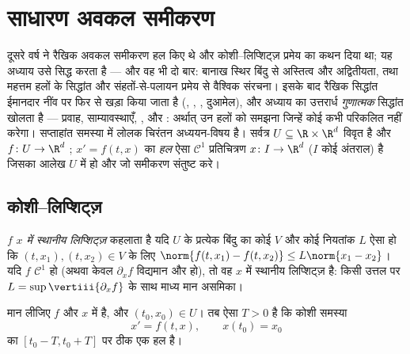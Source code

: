 \chapter{साधारण अवकल समीकरण}\label{ch:b3:ode}

दूसरे वर्ष ने रैखिक अवकल समीकरण हल किए थे और कोशी--लिप्शिट्ज़
प्रमेय का कथन दिया था; यह अध्याय उसे सिद्ध करता है --- और वह भी
दो बार: बानाख स्थिर बिंदु से अस्तित्व और अद्वितीयता, तथा महत्तम
हलों के सिद्धांत और संहतों-से-पलायन प्रमेय से वैश्विक संरचना।
इसके बाद रैखिक सिद्धांत ईमानदार नींव पर फिर से खड़ा किया जाता है
(, , , दुआमेल), और अध्याय का
उत्तरार्ध \emph{गुणात्मक} सिद्धांत खोलता है --- प्रवाह,
साम्यावस्थाएँ, , और : अर्थात्
उन हलों को समझना जिन्हें कोई कभी परिकलित नहीं करेगा। सप्ताहांत
समस्या में लोलक चिरंतन अध्ययन-विषय है। सर्वत्र $U \subseteq \R\times\R^d$ विवृत है और
$f \colon U \to \R^d$ ; $x' = f(t, x)$ का \emph{हल} ऐसा $\mathcal C^1$ प्रतिचित्रण $x \colon I \to \R^d$ ($I$ कोई
अंतराल) है जिसका आलेख $U$ में हो और जो समीकरण संतुष्ट करे।

\section{कोशी--लिप्शिट्ज़}

\begin{definition}\label{def:b3:ode:lipschitz}
$f$ \emph{$x$ में स्थानीय लिप्शिट्ज़}
कहलाता है यदि $U$ के प्रत्येक बिंदु का कोई  $V$ और कोई
नियतांक $L$ ऐसा हो कि $(t, x_1), (t, x_2) \in V$ के लिए $\norm{f(t, x_1) - f(t, x_2)} \leq L\norm{x_1 -
x_2}$। यदि $f$ $\mathcal
C^1$ हो (अथवा
केवल $\partial_xf$ विद्यमान और  हो), तो वह $x$ में स्थानीय लिप्शिट्ज़
है: किसी  उत्तल  पर $L =
\sup\vertiii{\partial_xf}$ के साथ माध्य मान असमिका।
\end{definition}

\begin{theorem}[कोशी--लिप्शिट्ज़, स्थानीय]
\label{thm:b3:ode:cauchylipschitz}
मान लीजिए $f$  और $x$ में  है, और $(t_0,
x_0) \in U$।
तब ऐसा $T > 0$ है कि कोशी समस्या
\[
x' = f(t, x), \qquad x(t_0) = x_0
\]
का $[t_0 - T, t_0 +
T]$ पर ठीक एक हल है।
\end{theorem}

